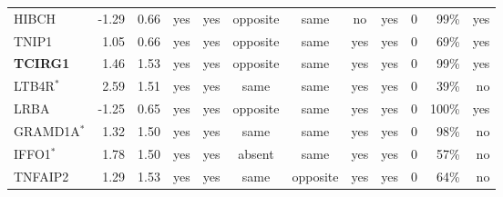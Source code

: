 \begin{table}[htbp]
{\begin{tabular}{lrrcccccccrr}
HIBCH & -1.29 & 0.66 & yes & yes & opposite & same & no & yes &  0 & 99\% & yes \\
TNIP1 & 1.05 & 0.66 & yes & yes & opposite & same & yes & yes &  0 & 69\% & yes \\
\textbf{TCIRG1} & 1.46 & 1.53 & yes & yes & opposite & same & yes & yes &  0 & 99\% & yes \\
LTB4R$^{*}$ & 2.59 & 1.51 & yes & yes & same & same & yes & yes &  0 & 39\% & no \\
LRBA & -1.25 & 0.65 & yes & yes & opposite & same & yes & yes &  0 & 100\% & yes \\
GRAMD1A$^{*}$ & 1.32 & 1.50 & yes & yes & same & same & yes & yes &  0 & 98\% & no \\
IFFO1$^{*}$ & 1.78 & 1.50 & yes & yes & absent & same & yes & yes &  0 & 57\% & no \\
TNFAIP2 & 1.29 & 1.53 & yes & yes & same & opposite & yes & yes &  0 & 64\% & no \\
\bottomrule
\end{tabular}}
\end{table}
